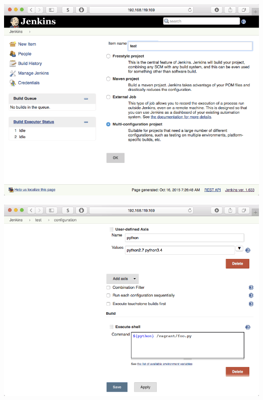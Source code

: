 \documentclass[xcolor=svgnames,17pt]{beamer}
\begin{document}
\begin{frame}[plain]{}
\includegraphics[width=\paperwidth,frame,center]{hello-4-multi-config.png}
\end{frame}

\begin{frame}[plain]{}
\includegraphics[width=\paperwidth,frame,center]{hello-5-multi-config-detail.png}
\end{frame}
\end{document}
